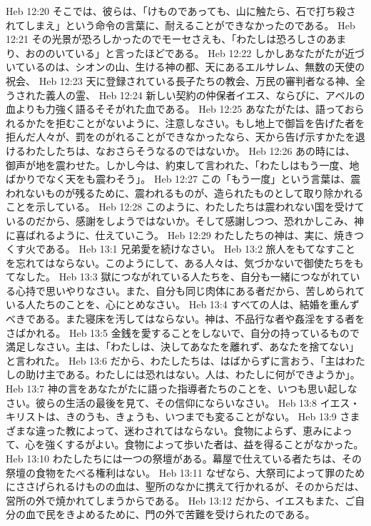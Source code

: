 Heb 12:20  そこでは、彼らは、「けものであっても、山に触たら、石で打ち殺されてしまえ」という命令の言葉に、耐えることができなかったのである。
Heb 12:21  その光景が恐ろしかったのでモーセさえも、「わたしは恐ろしさのあまり、おののいている」と言ったほどである。
Heb 12:22  しかしあなたがたが近づいているのは、シオンの山、生ける神の都、天にあるエルサレム、無数の天使の祝会、
Heb 12:23  天に登録されている長子たちの教会、万民の審判者なる神、全うされた義人の霊、
Heb 12:24  新しい契約の仲保者イエス、ならびに、アベルの血よりも力強く語るそそがれた血である。
Heb 12:25  あなたがたは、語っておられるかたを拒むことがないように、注意しなさい。もし地上で御旨を告げた者を拒んだ人々が、罰をのがれることができなかったなら、天から告げ示すかたを退けるわたしたちは、なおさらそうなるのではないか。
Heb 12:26  あの時には、御声が地を震わせた。しかし今は、約束して言われた、「わたしはもう一度、地ばかりでなく天をも震わそう」。
Heb 12:27  この「もう一度」という言葉は、震われないものが残るために、震われるものが、造られたものとして取り除かれることを示している。
Heb 12:28  このように、わたしたちは震われない国を受けているのだから、感謝をしようではないか。そして感謝しつつ、恐れかしこみ、神に喜ばれるように、仕えていこう。
Heb 12:29  わたしたちの神は、実に、焼きつくす火である。
Heb 13:1  兄弟愛を続けなさい。
Heb 13:2  旅人をもてなすことを忘れてはならない。このようにして、ある人々は、気づかないで御使たちをもてなした。
Heb 13:3  獄につながれている人たちを、自分も一緒につながれている心持で思いやりなさい。また、自分も同じ肉体にある者だから、苦しめられている人たちのことを、心にとめなさい。
Heb 13:4  すべての人は、結婚を重んずべきである。また寝床を汚してはならない。神は、不品行な者や姦淫をする者をさばかれる。
Heb 13:5  金銭を愛することをしないで、自分の持っているもので満足しなさい。主は、「わたしは、決してあなたを離れず、あなたを捨てない」と言われた。
Heb 13:6  だから、わたしたちは、はばからずに言おう、「主はわたしの助け主である。わたしには恐れはない。人は、わたしに何ができようか」。
Heb 13:7  神の言をあなたがたに語った指導者たちのことを、いつも思い起しなさい。彼らの生活の最後を見て、その信仰にならいなさい。
Heb 13:8  イエス・キリストは、きのうも、きょうも、いつまでも変ることがない。
Heb 13:9  さまざまな違った教によって、迷わされてはならない。食物によらず、恵みによって、心を強くするがよい。食物によって歩いた者は、益を得ることがなかった。
Heb 13:10  わたしたちには一つの祭壇がある。幕屋で仕えている者たちは、その祭壇の食物をたべる権利はない。
Heb 13:11  なぜなら、大祭司によって罪のためにささげられるけものの血は、聖所のなかに携えて行かれるが、そのからだは、営所の外で焼かれてしまうからである。
Heb 13:12  だから、イエスもまた、ご自分の血で民をきよめるために、門の外で苦難を受けられたのである。
